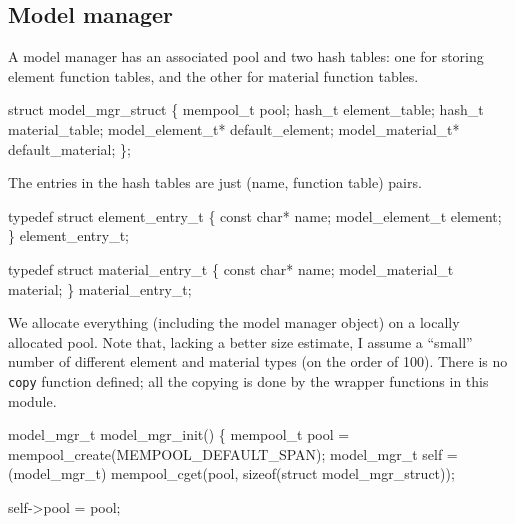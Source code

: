 \nwendcode{}\nwdocspar

\subsection{Model manager}

A model manager has an associated pool and two hash tables: one for
storing element function tables, and the other for material function
tables.

\nwenddocs{}\endmoddef
struct model_mgr_struct \{
    mempool_t pool;
    hash_t element_table;
    hash_t material_table;
    model_element_t*  default_element;
    model_material_t* default_material;
\};

\nwendcode{}\nwdocspar

The entries in the hash tables are just (name, function table) pairs.

\nwenddocs{}\plusendmoddef
typedef struct element_entry_t \{
    const char* name;
    model_element_t element;
\} element_entry_t;

typedef struct material_entry_t \{
    const char* name;
    model_material_t material;
\} material_entry_t;

\nwendcode{}\nwdocspar


We allocate everything (including the model manager object) on
a locally allocated pool.  Note that, lacking a better size estimate,
I assume a ``small'' number of different element and material types 
(on the order of 100).  There is no {\tt{}copy} function defined;
all the copying is done by the wrapper functions in this module.

\nwenddocs{}\plusendmoddef
model_mgr_t model_mgr_init()
\{
    mempool_t pool = mempool_create(MEMPOOL_DEFAULT_SPAN);
    model_mgr_t self = 
        (model_mgr_t) mempool_cget(pool, sizeof(struct model_mgr_struct));

    self->pool = pool;


